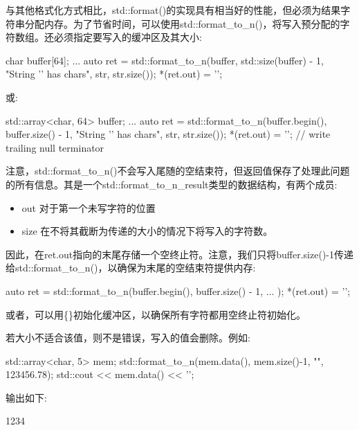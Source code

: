 
与其他格式化方式相比，std::format()的实现具有相当好的性能，但必须为结果字符串分配内存。为了节省时间，可以使用std::format\_to\_n()，将写入预分配的字符数组。还必须指定要写入的缓冲区及其大小:

\begin{cpp}
char buffer[64];
...
auto ret = std::format_to_n(buffer, std::size(buffer) - 1,
							"String '{}' has {} chars\n", str, str.size());
*(ret.out) = '\0';
\end{cpp}

或:

\begin{cpp}
std::array<char, 64> buffer;
...
auto ret = std::format_to_n(buffer.begin(), buffer.size() - 1,
							"String '{}' has {} chars\n", str, str.size());
*(ret.out) = '\0'; // write trailing null terminator
\end{cpp}

注意，std::format\_to\_n()不会写入尾随的空结束符，但返回值保存了处理此问题的所有信息。其是一个std::format\_to\_n\_result类型的数据结构，有两个成员:

\begin{itemize}
\item
out 对于第一个未写字符的位置

\item
size 在不将其截断为传递的大小的情况下将写入的字符数。
\end{itemize}

因此，在ret.out指向的末尾存储一个空终止符。注意，我们只将buffer.size()-1传递给std::format\_to\_n()，以确保为末尾的空结束符提供内存:

\begin{cpp}
auto ret = std::format_to_n(buffer.begin(), buffer.size() - 1, ... );
*(ret.out) = '\0';
\end{cpp}

或者，可以用\{\}初始化缓冲区，以确保所有字符都用空终止符初始化。

若大小不适合该值，则不是错误，写入的值会删除。例如:

\begin{cpp}
std::array<char, 5> mem{};
std::format_to_n(mem.data(), mem.size()-1, "{}", 123456.78);
std::cout << mem.data() << '\n';
\end{cpp}

输出如下:

\begin{shell}
1234
\end{shell}

